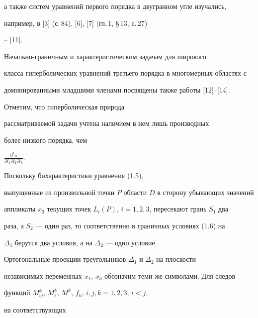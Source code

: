 а также систем уравнений первого порядка в двугранном угле изучались,


например, в [3] (с.\,84), [6], [7] (гл.\,1, \S\,13, с.\,27)


-- [11].





Начально-граничным и характеристическим задачам для широкого


класса гиперболических уравнений третьего порядка в многомерных областях с


доминированными младшими членами посвящены также работы [12]--[14].





\begin{note}


Отметим, что гиперболическая природа


рассматриваемой задачи учтена наличием в нем лишь производных 


более низкого порядка, чем


$\frac{\partial^{3}u}{\partial l_1 \partial l_2 \partial l_3}$.


\end{note}





\begin{note}


Поскольку бихарактеристики уравнения (1.5),


выпущенные из произвольной точки $P$ области $D$ в сторону убывающих значений


аппликаты $x_3$ текущих точек $L_i(P)$, $i=1,2,3$, пересекают грань $S_1$ два


раза, а $S_2$ --- один раз, то соответственно в граничных условиях (1.6) на


$\Delta_1$ берутся два условия, а на $\Delta_2$ --- одно условие.


\end{note}





Ортогональные проекции треугольников $\Delta_1$ и $\Delta_2$ на плоскости


независимых переменных $x_1$, $x_3$ обозначим теми же символами. Для следов


функций $M_{ij}^k$, $M_i^k$, $M^k$, $f_k$, $i,j,k=1,2,3$, $i<j$,


на соответствующих


